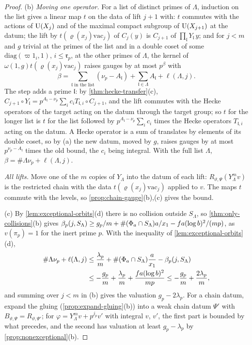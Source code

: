 \begin{proof}
(b) \emph{Moving one operator.} For a list of distinct primes of $\Lambda$, induction on the list gives a linear map $t$ on the data of lift $j+1$ with: $t$ commutes with the actions of $\operatorname{U}(X_j)$ and of the maximal compact subgroup of $\operatorname{U}(X_{j+1})$ at the datum; the lift by $t(\varrho(x_j)\mathrm{vac}_j)$ of $C_j(y)$ is $C_{j+1}$ of $\prod_{\mathfrak l}Y_{\mathfrak l}\,y$; and for $j<m$
and $g$ trivial at the primes of the list and in a double coset of some $\mathrm{diag}(\varpi1_i,1)$, $i\le\mathfrak r_p$, at the other primes of $\Lambda$, the kernel of $\omega(1,g)t(\varrho(x_j)\mathrm{vac}_j)$ raises gauges by at most $p^{\beta}$ with
\[
  \beta=\sum_{\mathfrak l\text{ in the list}}(\nu_p-A_{\mathfrak l})+\sum_{\mathfrak l\in\Lambda}A_{\mathfrak l}+\ell(\Lambda,j).
\]
The step adds a prime $\mathfrak l$: by \cref{thm:hecke-transfer}(c), $C_{j+1}\circ Y_{\mathfrak l}=p^{A_{\mathfrak l}-\nu_p}\sum_ic_iT_{\mathfrak l,i}\circ C_{j+1}$, and the lift commutes with the Hecke operators of the target acting on the datum through the target group; so $t$ for the longer list is $t$ for the list followed by $p^{A_{\mathfrak l}-\nu_p}\sum_ic_i$ times the Hecke
operators $T_{\mathfrak l,i}$ acting on the datum. A Hecke operator is a sum of translates by elements of its double coset, so by (a) the new datum, moved by $g$, raises gauges by at most $p^{\nu_p-A_{\mathfrak l}}$ times the old bound, the $c_i$ being integral. With the full list $\Lambda$, $\beta=\#\Lambda\nu_p+\ell(\Lambda,j)$.

\emph{All lifts.} Move one of the $m$ copies of $Y_\Lambda$ into the datum of each lift: $R_{\vartheta,\Psi}(Y_\Lambda^mv)$ is the restricted chain with the data $t(\varrho(x_j)\mathrm{vac}_j)$ applied to $v$. The maps $t$ commute with the levels, so \cref{prop:chain-gauge}(b),(c) gives the bound.

(c) By \cref{lem:exceptional-orbits}(d) there is no collision outside $S_\Lambda$, so \cref{thm:only-collisions}(b) gives $\beta_p(j,S_\Lambda)\ge g_p/m+\#(\Phi_a\cap S_\Lambda)a/x_1-fa(\log b)^2/(mp)$, as $v(\pi_p)=1$ for the inert prime $p$. With the inequality of \cref{lem:exceptional-orbits}(d),
\begin{align*}
  \#\Lambda\nu_p+\ell(\Lambda,j)&\le\frac{\lambda_p}m+\#(\Phi_a\cap S_\Lambda)\frac a{x_1}-\beta_p(j,S_\Lambda)\\
  &\le-\frac{g_p}m+\frac{\lambda_p}m+\frac{fa(\log b)^2}{mp}\le-\frac{g_p}m+\frac{2\lambda_p}m ,
\end{align*}
and summing over $j<m$ in (b) gives the valuation $g_p-2\lambda_p$. For a chain datum, expand the gluing (\cref{prop:expand-gluing}(b)) into a weak chain datum $\Psi'$ with $B_{\vartheta,\Psi}=R_{\vartheta,\Psi'}$; for $\varphi=Y_\Lambda^mv+p^{j_p}v'$ with integral $v$, $v'$, the first part is bounded by what precedes, and the second has valuation at least
$g_p-\lambda_p$ by \cref{prop:nonexceptional}(b).
\end{proof}

